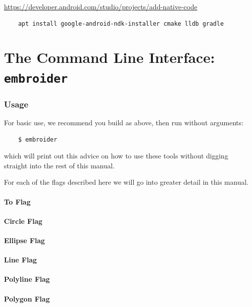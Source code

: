 \documentclass[a4paper, 11pt]{report}
\begin{document}
\url{https://developer.android.com/studio/projects/add-native-code}

\begin{verbatim}
    apt install google-android-ndk-installer cmake lldb gradle
\end{verbatim}

\chapter{The Command Line Interface: \texttt{embroider}}

\subsection{Usage}

For basic use, we recommend you build as above, then run without arguments:

\begin{verbatim}
    $ embroider
\end{verbatim}

which will print out this advice on how to use these tools without digging straight into the rest of this manual.



For each of the flags described here we will go into greater detail in this manual.

\subsubsection{To Flag}

\subsubsection{Circle Flag}

\subsubsection{Ellipse Flag}

\subsubsection{Line Flag}

\subsubsection{Polyline Flag}

\subsubsection{Polygon Flag}
\end{document}
